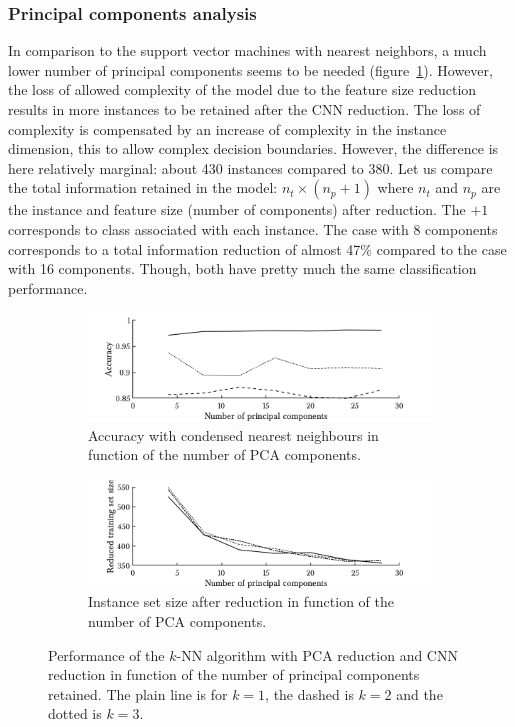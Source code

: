 \subsubsection{Principal components analysis}
In comparison to the support vector machines with nearest neighbors, a much lower number of principal components seems to be needed (figure~\ref{fig:knn-cnn-pca}). However, the loss of allowed complexity of the model due to the feature size reduction results in more instances to be retained after the CNN reduction. The loss of complexity is compensated by an increase of complexity in the instance dimension, this to allow complex decision boundaries. However, the difference is here relatively marginal: about 430 instances compared to 380. Let us compare the total information retained in the model: $n_t \times (n_p+1)$ where $n_t$ and $n_p$ are the instance and feature size (number of components) after reduction. The $+1$ corresponds to class associated with each instance. The case with 8 components corresponds to a total information reduction of almost 47\% compared to the case with 16 components. Though, both have pretty much the same classification performance.

\begin{figure}[h!]
        \begin{subfigure}[b]{.97\textwidth}  
            \centering 
            \includegraphics[width=.98\textwidth]{parts/chap-4/img-knn/cnn-pca/acc.png}
            \caption{Accuracy with condensed nearest neighbours in function of the number of PCA components.}
        \end{subfigure}
        \vfill
        \begin{subfigure}[b]{.97\textwidth}  
            \centering 
            \includegraphics[width=.98\textwidth]{parts/chap-4/img-knn/cnn-pca/red.png}
            \caption{Instance set size after reduction in function of the number of PCA components.} 
        \end{subfigure}
        \caption[CNN results with PCA.]{Performance of the $k$-NN algorithm with PCA reduction and CNN reduction in function of the number of principal components retained. The plain line is for $k=1$, the dashed is $k=2$ and the dotted is $k=3$.}
        \label{fig:knn-cnn-pca}
\end{figure}

